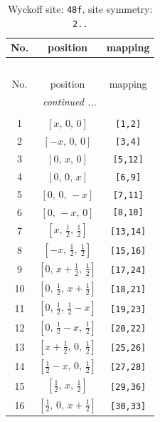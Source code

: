 \documentclass[fleqn,8pt]{jsarticle}
\begin{document}
\begin{longtable}{ccc}
\caption{Wyckoff site: {\tt 48f}, site symmetry: {\tt 2..}}
 \\
 \hline \hline
No. & position & mapping \\ \hline \endfirsthead

\multicolumn{2}{l}{\tablename\ \thetable{}} \\
 \hline \hline
No. & position & mapping \\ \hline \endhead

 \hline \hline
\multicolumn{2}{r}{\footnotesize\it continued ...} \\ \endfoot

 \hline \hline
\multicolumn{2}{r}{} \\ \endlastfoot

1 & $\left[ x,\, 0,\, 0 \right]$ & {\tt [1,2]} \\ \hline
2 & $\left[ - x,\, 0,\, 0 \right]$ & {\tt [3,4]} \\ \hline
3 & $\left[ 0,\, x,\, 0 \right]$ & {\tt [5,12]} \\ \hline
4 & $\left[ 0,\, 0,\, x \right]$ & {\tt [6,9]} \\ \hline
5 & $\left[ 0,\, 0,\, - x \right]$ & {\tt [7,11]} \\ \hline
6 & $\left[ 0,\, - x,\, 0 \right]$ & {\tt [8,10]} \\ \hline
7 & $\left[ x,\, \frac{1}{2},\, \frac{1}{2} \right]$ & {\tt [13,14]} \\ \hline
8 & $\left[ - x,\, \frac{1}{2},\, \frac{1}{2} \right]$ & {\tt [15,16]} \\ \hline
9 & $\left[ 0,\, x + \frac{1}{2},\, \frac{1}{2} \right]$ & {\tt [17,24]} \\ \hline
10 & $\left[ 0,\, \frac{1}{2},\, x + \frac{1}{2} \right]$ & {\tt [18,21]} \\ \hline
11 & $\left[ 0,\, \frac{1}{2},\, \frac{1}{2} - x \right]$ & {\tt [19,23]} \\ \hline
12 & $\left[ 0,\, \frac{1}{2} - x,\, \frac{1}{2} \right]$ & {\tt [20,22]} \\ \hline
13 & $\left[ x + \frac{1}{2},\, 0,\, \frac{1}{2} \right]$ & {\tt [25,26]} \\ \hline
14 & $\left[ \frac{1}{2} - x,\, 0,\, \frac{1}{2} \right]$ & {\tt [27,28]} \\ \hline
15 & $\left[ \frac{1}{2},\, x,\, \frac{1}{2} \right]$ & {\tt [29,36]} \\ \hline
16 & $\left[ \frac{1}{2},\, 0,\, x + \frac{1}{2} \right]$ & {\tt [30,33]} \\ \hline

\end{longtable}
\end{document}
